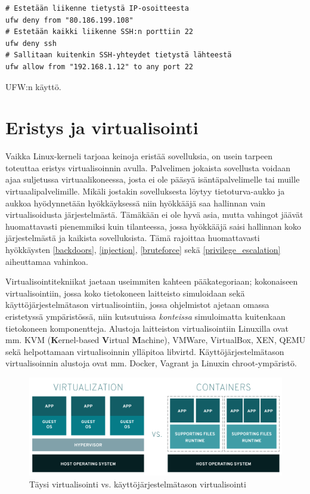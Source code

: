 \begin{algorithm}[tbh]
\begin{verbatim}
# Estetään liikenne tietystä IP-osoitteesta
ufw deny from "80.186.199.108"
# Estetään kaikki liikenne SSH:n porttiin 22
ufw deny ssh
# Sallitaan kuitenkin SSH-yhteydet tietystä lähteestä
ufw allow from "192.168.1.12" to any port 22
\end{verbatim}
\caption{UFW:n käyttö.\label{alg:ufw}}
\end{algorithm}


\section{Eristys ja virtualisointi}\label{eristys_ja_virtualisointi}
Vaikka Linux-kerneli tarjoaa keinoja eristää sovelluksia, on usein tarpeen toteuttaa eristys virtualisoinnin avulla. Palvelimen jokaista sovellusta voidaan ajaa suljetussa virtuaalikoneessa, josta ei ole pääsyä isäntäpalvelimelle tai muille virtuaalipalvelimille. Mikäli jostakin sovelluksesta löytyy tietoturva-aukko ja aukkoa hyödynnetään hyökkäyksessä niin hyökkääjä saa hallinnan vain virtualisoidusta järjestelmästä. Tämäkään ei ole hyvä asia, mutta vahingot jäävät huomattavasti pienemmiksi kuin tilanteessa, jossa hyökkääjä saisi hallinnan koko järjestelmästä ja kaikista sovelluksista. Tämä rajoittaa huomattavasti hyökkäysten \ref{backdoors}, \ref{injection}, \ref{bruteforce} sekä \ref{privilege_escalation} aiheuttamaa vahinkoa.~\cite{portnoy2016virtualization}

Virtualisointitekniikat jaetaan useimmiten kahteen pääkategoriaan; kokonaiseen virtualisointiin, jossa koko tietokoneen laitteisto simuloidaan sekä käyttöjärjestelmätason virtualisointiin, jossa ohjelmistot ajetaan omassa eristetyssä ympäristössä, niin kutsutuissa \textit{konteissa} simuloimatta kuitenkaan tietokoneen komponentteja.
Alustoja laitteiston virtualisointiin Linuxilla ovat mm. KVM (\textbf{K}ernel-based \textbf{V}irtual \textbf{M}achine), VMWare, VirtualBox, XEN, QEMU sekä helpottamaan virtualisoinnin ylläpitoa libvirtd.
Käyttöjärjestelmätason virtualisoinnin alustoja ovat mm. Docker, Vagrant ja Linuxin chroot-ympäristö.~\cite{portnoy2016virtualization}

\begin{figure}
\centering \includegraphics[width=1\textwidth]{kuvat/virtualization_vs_containers.png}
\caption{Täysi virtualisointi vs. käyttöjärjestelmätason virtualisointi~\cite{redhat:virtualization_vs_containers}}
\label{virtualization_vs_containers_image} 
\end{figure}

